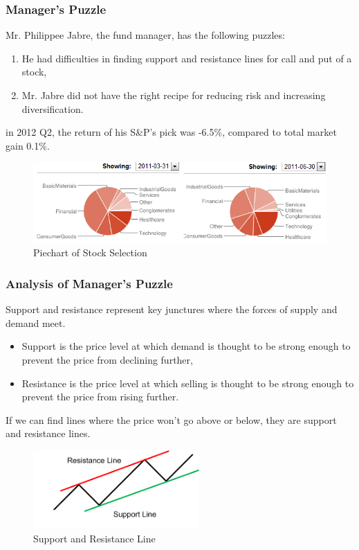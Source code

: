 \documentclass[compress,handout,10pt]{beamer}
\let\olditem\item
\renewcommand{\item}{\setlength{\itemsep}{0.5\baselineskip}\olditem}
\begin{document}
\begin{frame}
    \frametitle{Manager's Puzzle}
Mr. Philippee Jabre, the fund manager, has the following puzzles:
\vspace{7pt}    
\begin{enumerate}
 \item  He had difficulties in finding support and resistance lines for call and put of a stock,
\item  Mr. Jabre did not have the right recipe for reducing risk and increasing diversification.   
\end{enumerate} 
\color{red} in 2012 Q2, the return of his S\&P's pick was -6.5\%, compared to total market gain 0.1\%. 
\begin{figure}[h]
    \begin{center}
        \includegraphics[width=\textwidth]{images/1.png}
    \end{center}
    \caption{Piechart of Stock Selection}
    \label{fig:Piechart}
\end{figure}  
\end{frame}

\begin{frame}
    \frametitle{Analysis of Manager's Puzzle}
Support and resistance represent key junctures where the forces of supply and demand meet.
\begin{itemize}
\item Support is the price level at which demand is thought to be strong enough to prevent the price from declining further, 
\item Resistance is the price level at which selling is thought to be strong enough to prevent the price from rising further.
\end{itemize}
If we can find lines where the price won't go above or below, they are support and resistance lines.
\begin{figure}[h]
    \begin{center}
        \includegraphics[width=2.5in]{images/2.png}
    \end{center}
    \caption{Support and Resistance Line}
    \label{fig:SRL}
\end{figure}  
\end{frame}
\end{document}
